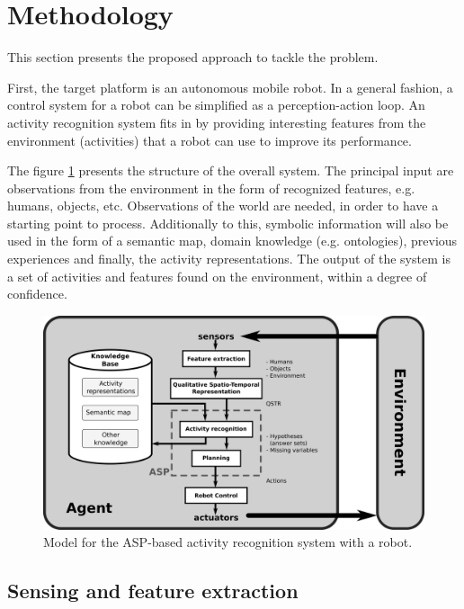 

\section{Methodology} \label{sec_methodology}

This section presents the proposed approach to tackle the problem.

First, the target platform is an autonomous mobile robot.
In a general fashion, a control system for a robot can be simplified as a perception-action loop. %
An activity recognition system fits in by providing interesting features from the environment (activities) that a robot can use to improve its performance.

The figure \ref{fig:structure} presents the structure of the overall system.
The principal input are observations from the environment in the form of recognized features, e.g. humans, objects, etc.
Observations of the world are needed, in order to have a starting point to process.
Additionally to this, symbolic information will also be used in the form of a semantic map, domain knowledge (e.g. ontologies), previous experiences and finally, the activity representations.
The output of the system is a set of activities and features found on the environment, within a degree of confidence.

\begin{figure}[h]
\centering
\includegraphics[width=\textwidth]{fig/img_structure.pdf}
\caption{Model for the ASP-based activity recognition system with a robot.}
\label{fig:structure}
\end{figure}


\subsection{Sensing and feature extraction}

